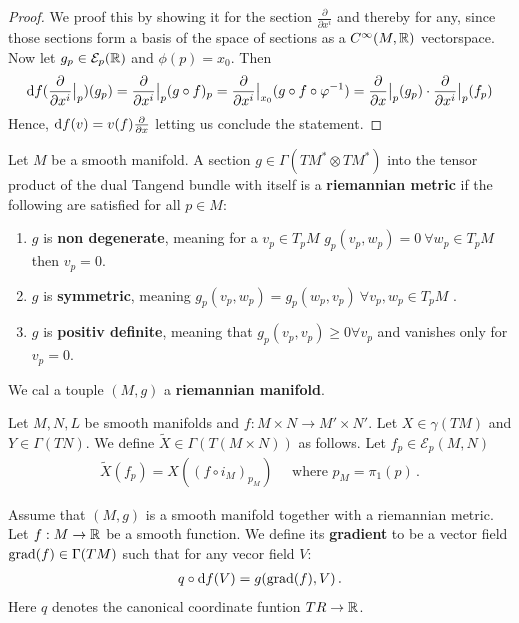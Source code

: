 \begin{proof}
	We proof this by showing it for the section $\frac{\partial}{\partial x^i}$ and thereby for any, since those sections form a basis of the space of sections as a $C^{\infty}(M,\mathbb{R})$ vectorspace. Now let $g_p\in \mathcal{E}_p(\mathbb{R})$ and $\phi(p)=x_0$. Then
	\begin{align*}
		\mathop{}\!\mathrm{d} f(\frac{\partial }{\partial x^i}\big|_p)(g_p)= \frac{\partial }{\partial x^i}\big|_p (g\circ f)_p=\frac{\partial }{\partial x^i}\big|_{x_0}(g\circ f\circ \varphi^{-1})=\frac{\partial }{\partial x}\big|_{p}(g_p) \cdot \frac{\partial }{\partial x^i}\big|_p(f_p)
	\end{align*}
	Hence, $\mathop{}\!\mathrm{d} f (v)=v(f)\frac{\partial }{\partial x}$ letting us conclude the statement.
\end{proof}
\begin{definition}[A Metric]
	Let $M$ be a smooth manifold.
	A section $g\in \Gamma(TM^*\otimes TM^*)$ into the tensor product of the dual Tangend bundle with itself is a\textbf{ riemannian metric} if the following are satisfied for all $p\in M$:
	\begin{enumerate}
		\item $g$ is \textbf{non degenerate}, meaning for a $v_p\in T_pM$ $g_p(v_p,w_p)=0 ~\forall w_p\in T_pM$ then $v_p=0$.
		\item $g$ is \textbf{symmetric}, meaning $g_p(v_p,w_p)=g_p(w_p,v_p)~\forall v_p,w_p\in T_pM$ .
		\item $g$ is \textbf{positiv definite}, meaning that $g_p(v_p,v_p)\geq 0 \forall v_p$ and vanishes only for $v_p=0$.
	\end{enumerate} We cal a touple $(M,g)$ a \textbf{riemannian manifold}.
\end{definition}
	\begin{definition}
		Let $M,N,L$ be smooth manifolds and $f:M\times N \to M'\times N'$. Let $X\in \gamma(TM)$ and $Y\in \Gamma(TN)$. We define $\tilde{X}\in \Gamma(T(M\times N))$ as follows. Let $f_p\in \mathcal{E}_p(M,N)$
		\begin{align*}
			\tilde{X}(f_p)=X((f\circ i_M)_{p_M}) \quad \text{ where }p_M=\pi_1(p) \, .
		\end{align*}
	\end{definition}
\begin{definition}
Assume that $(M,g)$ is a smooth manifold together with a riemannian metric. Let $f:M\to \mathbb{R}$ be a smooth function. We define its \textbf{gradient} to be a vector field $\mathrm{grad}(f)\in \Gamma(TM)$ such that for any vecor field $V$:
\begin{align*}
q\circ \mathop{}\!\mathrm{d} f (V) = g(\mathrm{grad}(f),V) \, .
\end{align*} Here $q$ denotes the canonical coordinate funtion $TR\to \mathbb{R}$.
\end{definition}
